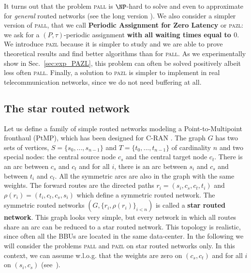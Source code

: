 \documentclass[a4paper,10pt]{IEEEtran}
\newcommand{\todo}[1]{{\color{red} TODO: {#1}}}
\newcommand\pazl{\textsc{pazl}\xspace}
\newcommand\pall{\textsc{pall}\xspace}
\begin{document}
      It turns out that the problem \pall is $\NP$-hard to solve and even to approximate for \emph{general} routed networks (see the long version \cite{versionlongue}).      
        We also consider a simpler version of \pall, that we call {\bf Periodic Assignment for Zero Latency} or \pazl: we ask for a $(P,\tau)$-periodic assignment {\bf with all waiting times equal to $0$}. We introduce \pazl because it is simpler to study and we are able to prove theoretical results and find better algorithms than for \pall. As we  experimentally show in Sec.~\ref{sec:exp_PAZL}, this problem can often be solved positively albeit less often \pall. Finally, a solution to \pazl is simpler to implement in real telecommunication networks, since we do not need buffering at all. 
       
    
    \subsection{The star routed network}
    
     Let us define a family of simple routed networks modeling a Point-to-Multipoint fronthaul (PtMP), which has been designed for C-RAN \cite{tayq2017real}. 
      The graph $G$ has two sets of vertices, $S=\{s_0,...,s_{n-1}\}$ and $T=\{t_0,...,t_{n-1}\}$ of cardinality $n$ and two special nodes:
      the central source node {\bf $c_s$} and the central target node {\bf $c_t$}.
      There is an arc between {\bf $c_s$} and {\bf $c_t$} and for all $i$, there is an arc between $s_i$ and $c_s$ and between $t_i$ and $c_t$.
      All the symmetric arcs are also in the graph with the same weights.
      The forward routes are the directed paths $r_i = (s_i,c_s,c_t,t_i)$ and $\rho(r_i) = (t_i,c_t,c_s,s_i)$ which define a symmetric routed network. 
      The symmetric routed networks $(G, \{r_i,\rho(r_i)\}_{i<n})$ is called a \textbf{star routed network}. This graph looks very simple, but every network in which all routes share an arc can be reduced to a star routed network. This topology is realistic, since often all the BBUs are located in the same data-center. 
      In the following we will consider the problems \pall and \pazl on star routed networks only. 
      In this context, we can assume w.l.o.g. that the weights are zero on $(c_s,c_t)$ and for all $i$ on $(s_i,c_s)$ (see~\cite{versionlongue}).

%      
      
\end{document}
